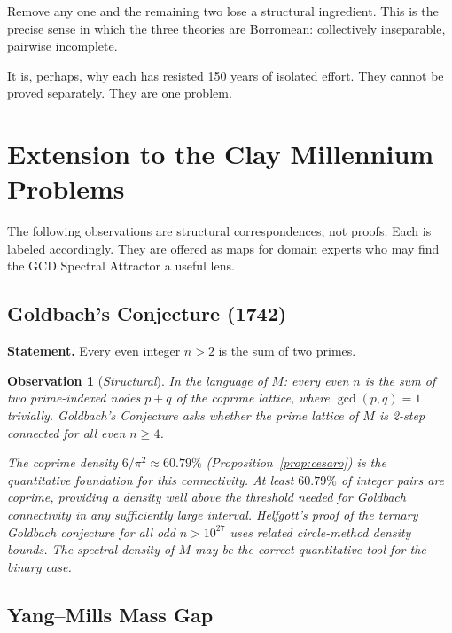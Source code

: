 \documentclass[12pt]{article}
\newtheorem{observation}[theorem]{Observation}
\begin{document}
Remove any one and the remaining two lose a structural
ingredient. This is the precise sense in which the three
theories are Borromean: collectively inseparable, pairwise
incomplete.

It is, perhaps, why each has resisted 150 years of isolated
effort. They cannot be proved separately. They are one problem.

\section{Extension to the Clay Millennium Problems}

The following observations are structural correspondences,
not proofs. Each is labeled accordingly. They are offered
as maps for domain experts who may find the GCD Spectral
Attractor a useful lens.

\subsection{Goldbach's Conjecture (1742)}

\textbf{Statement.} Every even integer $n > 2$ is the sum of two primes.

\begin{observation}[\emph{Structural}]
\label{obs:goldbach}
In the language of $M$: every even $n$ is the sum of two
prime-indexed nodes $p + q$ of the coprime lattice, where
$\gcd(p,q) = 1$ trivially. Goldbach's Conjecture asks
whether the prime lattice of $M$ is \emph{2-step connected}
for all even $n \geq 4$.

The coprime density $6/\pi^2 \approx 60.79\%$
(Proposition~\ref{prop:cesaro}) is the quantitative
foundation for this connectivity. At least $60.79\%$ of
integer pairs are coprime, providing a density well above
the threshold needed for Goldbach connectivity in any
sufficiently large interval. Helfgott's proof of the ternary
Goldbach conjecture \cite{Helfgott2013} for all odd
$n > 10^{27}$ uses related circle-method density bounds.
The spectral density of $M$ may be the correct quantitative
tool for the binary case.
\end{observation}

\subsection{Yang--Mills Mass Gap}
\end{document}
